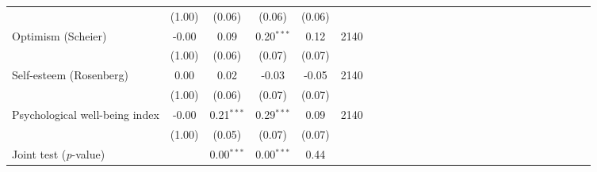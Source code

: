 {\begin{tabular}{l*{5}{SSSSc}}
          &   (1.00)&   (0.06)&   (0.06)&   (0.06)&         \\
Optimism (Scheier)&    -0.00&     0.09&0.20$^{***}$&     0.12&     2140\\
          &   (1.00)&   (0.06)&   (0.07)&   (0.07)&         \\
Self-esteem (Rosenberg)&     0.00&     0.02&    -0.03&    -0.05&     2140\\
          &   (1.00)&   (0.06)&   (0.07)&   (0.07)&         \\
Psychological well-being index&    -0.00&0.21$^{***}$&0.29$^{***}$&     0.09&     2140\\
          &   (1.00)&   (0.05)&   (0.07)&   (0.07)&         \\
\midrule Joint test (\emph{p}-value)&         &{0.00$^{***}$}&{0.00$^{***}$}&   {0.44}&         \\
\bottomrule
\end{tabular}
}
